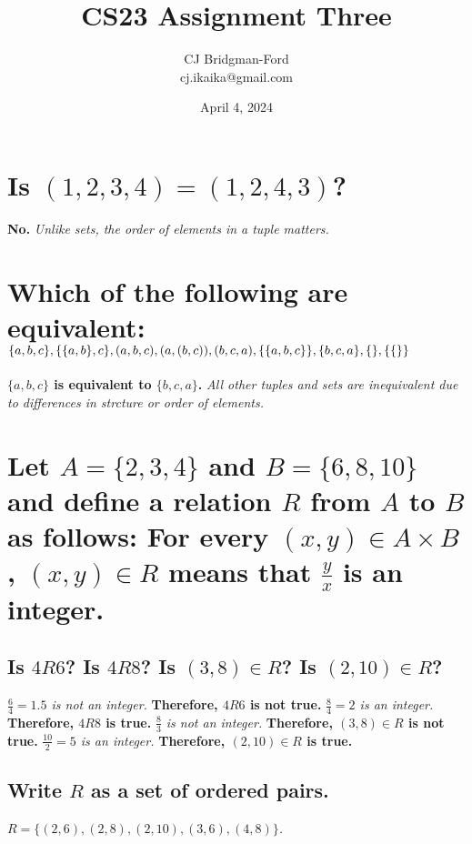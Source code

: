 \documentclass{article}
\title{CS23 Assignment Three}
\author{CJ Bridgman-Ford \\ cj.ikaika@gmail.com}
\date{April 4, 2024}
\begin{document}
\maketitle
\thispagestyle{empty}


\clearpage

\section{Is $(1, 2, 3, 4) = (1, 2, 4, 3)$?}
\hspace{1cm}\textbf{No.}\textit{ Unlike sets, the order of elements in a tuple matters.}

\section{Which of the following are equivalent: \\
    $\{a, b, c\}, \{\{a, b\}, c\}, (a, b, c), (a, (b, c)), (b, c, a),
    \\ \{\{a, b, c\}\}, \{b, c, a\}, \{\}, \{\{\}\}$}
\hspace{1cm}\textbf{$\{a, b, c\}$ is equivalent to $\{b, c, a\}$.}\textit{
    All other tuples and sets are inequivalent due to differences in strcture
    or order of elements.}


\section{Let $A = \{2, 3, 4\}$ and $B = \{6, 8, 10\}$ and define
    a relation $R$ from $A$ to $B$ as follows:
    For every $(x, y) \in A \times B$, $(x, y) \in R$ means that
    $\frac{y}{x}$ is an integer.}
\subsection{Is $4R6$? Is $4R8$? Is $(3,8) \in R$? Is $(2,10) \in R$?}
\hspace{1cm}\textit{$\frac{6}{4} = 1.5$ is not an integer.}\textbf{ Therefore,
    $4R6$ is not true.}\textit{ $\frac{8}{4} = 2$ is an integer.}\textbf{ Therefore,
    $4R8$ is true.}\textit{ $\frac{8}{3}$ is not an integer.}\textbf{ Therefore,
    $(3,8) \in R$ is not true.}\textit{ $\frac{10}{2} = 5$ is an integer.}
    \textbf{ Therefore, $(2,10) \in R$ is true.}
\subsection{Write $R$ as a set of ordered pairs.}
\hspace{1cm}\textit{$R = \{(2,6),(2,8),(2,10),(3,6),(4,8)\}$.}
\end{document}
